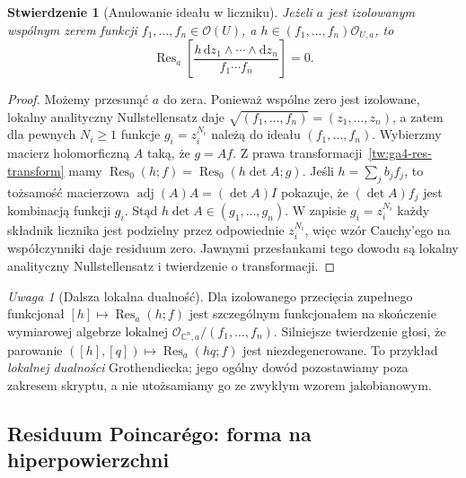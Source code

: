 \documentclass[11pt,a4paper,openany]{report}
\numberwithin{equation}{section}
\theoremstyle{plain}
\newtheorem{stwierdzenie}[twierdzenie]{Stwierdzenie}
\theoremstyle{definition}
\theoremstyle{remark}
\newtheorem{uwaga}[twierdzenie]{Uwaga}
\newcommand{\C}{\mathbb C}
\begin{document}
\begin{stwierdzenie}[Anulowanie ideału w liczniku]
\label{st:ga4-res-annihilates}
Jeżeli $a$ jest izolowanym wspólnym zerem funkcji
$f_1,\ldots,f_n\in\mathcal O(U)$, a
$h\in(f_1,\ldots,f_n)\mathcal O_{U,a}$, to
\[
\operatorname{Res}_a\!\left[
\frac{h\,\mathrm dz_1\wedge\cdots\wedge\mathrm dz_n}
{f_1\cdots f_n}\right]=0.
\]
\end{stwierdzenie}
\begin{proof}
Możemy przesunąć $a$ do zera. Ponieważ wspólne zero
jest izolowane, lokalny analityczny Nullstellensatz daje
$\sqrt{(f_1,\ldots,f_n)}=(z_1,\ldots,z_n)$,
a zatem dla pewnych $N_i\ge1$ funkcje $g_i=z_i^{N_i}$
należą do ideału $(f_1,\ldots,f_n)$.
Wybierzmy macierz holomorficzną $A$ taką, że $g=Af$.
Z prawa transformacji~\ref{tw:ga4-res-transform} mamy
$\operatorname{Res}_0(h;f)=\operatorname{Res}_0(h\det A;g)$.
Jeśli $h=\sum_j b_jf_j$, to tożsamość macierzowa
$\operatorname{adj}(A)A=(\det A)I$ pokazuje, że
$(\det A)f_j$ jest kombinacją funkcji $g_i$.
Stąd $h\det A\in(g_1,\ldots,g_n)$.
W zapisie $g_i=z_i^{N_i}$ każdy składnik licznika
jest podzielny przez odpowiednie $z_i^{N_i}$,
więc wzór Cauchy'ego na współczynniki daje residuum zero.
Jawnymi przesłankami tego dowodu są lokalny analityczny
Nullstellensatz i twierdzenie o transformacji.
\end{proof}

\begin{uwaga}[Dalsza lokalna dualność]
Dla izolowanego przecięcia zupełnego funkcjonał
$[h]\mapsto\operatorname{Res}_a(h;f)$ jest
szczególnym funkcjonałem na skończenie wymiarowej
algebrze lokalnej $\mathcal O_{\C^n,a}/(f_1,\ldots,f_n)$.
Silniejsze twierdzenie głosi, że parowanie
$([h],[q])\mapsto\operatorname{Res}_a(hq;f)$ jest
niezdegenerowane. To przykład \emph{lokalnej dualności}
Grothendiecka; jego ogólny dowód pozostawiamy poza
zakresem skryptu, a nie utożsamiamy go ze zwykłym
wzorem jakobianowym.
\end{uwaga}

\subsection{Residuum Poincarégo: forma na hiperpowierzchni}
\label{subsec:ga4-poincare-res}
\end{document}
